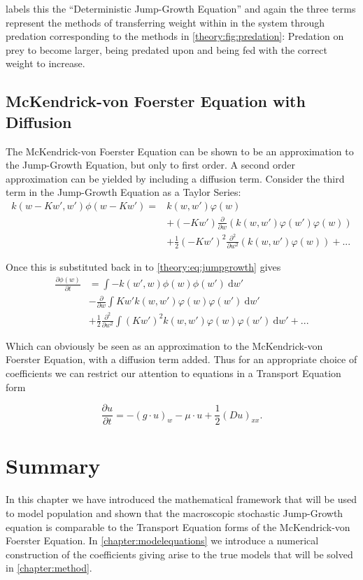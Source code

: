 \documentclass[../main.tex]{subfiles}
\begin{document}
  \cite{datta2010} labels this the ``Deterministic Jump-Growth Equation'' and again the three terms represent the methods of transferring weight within in the system through predation corresponding to the methods in \autoref{theory:fig:predation}: Predation on prey to become larger, being predated upon and being fed with the correct weight to increase.

  \subsection{McKendrick-von Foerster Equation with Diffusion}\label{theory:sec:mvfdiffusion}
  The McKendrick-von Foerster Equation can be shown to be an approximation to the Jump-Growth Equation, but only to first order. A second order approximation can be yielded by including a diffusion term. Consider the third term in the Jump-Growth Equation as a Taylor Series:
  \begin{align}
    k(w - Kw', w')\phi(w - K w')
    = & k(w, w') \varphi(w) \nonumber \\
      & + (-K w') \frac{\partial}{\partial w} \left(k(w, w')\varphi(w')\varphi(w)\right) \nonumber \\
      & + \frac{1}{2}(-K w')^2 \frac{\partial^2}{\partial w^2} \left(k(w, w')\varphi(w)\right) + ...
  \end{align}

  Once this is substituted back in to \autoref{theory:eq:jumpgrowth} gives
  \begin{align}\label{theory:eq:jumpdiffusion}
    \frac{\partial \phi(w)}{\partial t}
    & = \int - k(w', w) \phi(w)\phi(w')  \: \mathrm{d}w' \nonumber \\
    & - \frac{\partial}{\partial w} \int K w' k(w, w')\varphi(w)\varphi(w') \: \mathrm{d}w' \nonumber \\
    & + \frac{1}{2}\frac{\partial^2}{\partial w^2} \int (K w')^2 k(w, w')\varphi(w)\varphi(w') \: \mathrm{d}w' + ...
  \end{align}

  Which can obviously be seen as an approximation to the McKendrick-von Foerster Equation, with a diffusion term added. Thus for an appropriate choice of coefficients we can restrict our attention to equations in a Transport Equation form

  \begin{equation}\label{theory:eq:jumptransport}
    \frac{\partial u}{\partial t} = - (g \cdot u)_w - \mu \cdot u + \frac{1}{2}(D u)_{xx}.
  \end{equation}

  \section{Summary}
  In this chapter we have introduced the mathematical framework that will be used to model population and shown that the macroscopic stochastic Jump-Growth equation is comparable to the Transport Equation forms of the McKendrick-von Foerster Equation. In \autoref{chapter:modelequations} we introduce a numerical construction of the coefficients giving arise to the true models that will be solved in \autoref{chapter:method}.
\end{document}
